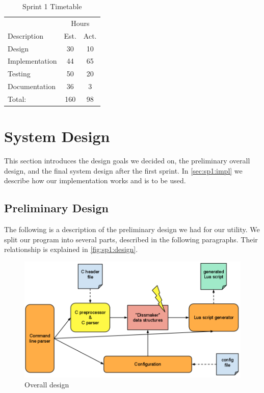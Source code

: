 \begin{table}[!ht] \small \center
\caption{Sprint 1 Timetable\label{tab:sprint1time}}
\begin{tabularx}{\textwidth}{X c c}
	\toprule
	& \multicolumn{2}{c}{Hours} \\
	\cmidrule(r){2-3}
	Description & Est. & Act. \\
	\midrule
	Design & 30 & 10\\
	\addlinespace
	Implementation & 44 & 65 \\
	\addlinespace
	Testing & 50 & 20\\
	\addlinespace
	Documentation & 36 & 3\\
	\midrule
	Total: & 160 & 98 \\
	\bottomrule
\end{tabularx}
\end{table}


\section{System Design}
\label{sec:sp1:design}
This section introduces the design goals we decided on, the preliminary overall
design, and the final system design after the first sprint. In
\autoref{sec:sp1:impl} we describe how our implementation works and is to be
used.

\subsection{Preliminary Design}
The following is a description of the preliminary design we had for our
\gls{utility}. We split our program into several parts, described in the
following paragraphs. Their relationship is explained in
\autoref{fig:sp1:design}.

\begin{figure}[!htb]
	\center
	\includegraphics[width=\textwidth]{./sprints/img/design}
	\caption{Overall design\label{fig:sp1:design}}
\end{figure}

